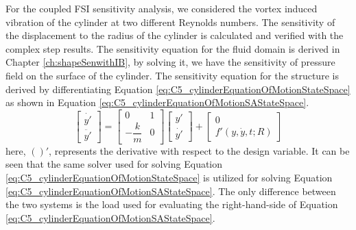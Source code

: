 For the coupled FSI sensitivity analysis, we considered the vortex induced vibration of the cylinder at two different Reynolds numbers. The sensitivity of the displacement to the radius of the cylinder is calculated and verified with the complex step results. The sensitivity equation for the fluid domain is derived in Chapter \ref{ch:shapeSenwithIB}, by solving it, we have the sensitivity of pressure field on the surface of the cylinder. The sensitivity equation for the structure is derived by differentiating Equation \eqref{eq:C5_cylinderEquationOfMotionStateSpace} as shown in Equation \eqref{eq:C5_cylinderEquationOfMotionSAStateSpace}.
%
\begin{equation}\label{eq:C5_cylinderEquationOfMotionSAStateSpace}
	\begin{bmatrix}
	\dot{y'} \\
	\ddot{y'}
	\end{bmatrix} = 
	\begin{bmatrix}
	0 & 1 \\
	-\dfrac{k}{m} & 0
	\end{bmatrix}
	\begin{bmatrix}
	y' \\
	\dot{y'}
	\end{bmatrix} + 
	\begin{bmatrix}
	0 \\
	f'(y, \dot{y}, t; R)
	\end{bmatrix}
\end{equation}
%
here, $()'$, represents the derivative with respect to the design variable. It can be seen that the same solver used for solving Equation \eqref{eq:C5_cylinderEquationOfMotionStateSpace} is utilized for solving Equation \eqref{eq:C5_cylinderEquationOfMotionSAStateSpace}. The only difference between the two systems is the load used for evaluating the right-hand-side of Equation \eqref{eq:C5_cylinderEquationOfMotionSAStateSpace}.

